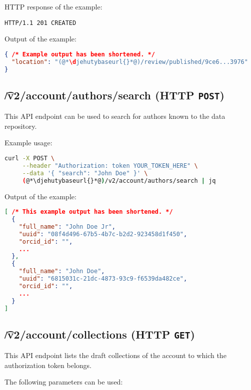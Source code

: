   HTTP response of the example:
\begin{lstlisting}
HTTP/1.1 201 CREATED
\end{lstlisting}

  Output of the example:
\begin{lstlisting}[language=JSON]
{ /* Example output has been shortened. */
  "location": "(@*\djehutybaseurl{}*@)/review/published/9ce6...3976"
}
\end{lstlisting}

\subsection{\t{/v2/account/authors/search} (HTTP \texttt{POST})}

  This API endpoint can be used to search for authors known to the data
  repository.

  Example usage:
\begin{lstlisting}[language=bash]
curl -X POST \
     --header "Authorization: token YOUR_TOKEN_HERE" \
     --data '{ "search": "John Doe" }' \
     (@*\djehutybaseurl{}*@)/v2/account/authors/search | jq
\end{lstlisting}

  Output of the example:
\begin{lstlisting}[language=JSON]
[ /* This example output has been shortened. */
  {
    "full_name": "John Doe Jr",
    "uuid": "08f4d496-67b5-4b7c-b2d2-923458d1f450",
    "orcid_id": "",
    ...
  },
  {
    "full_name": "John Doe",
    "uuid": "6815031c-21dc-4873-93c9-f6539da482ce",
    "orcid_id": "",
    ...
  }
]
\end{lstlisting}

\subsection{\t{/v2/account/collections} (HTTP \texttt{GET})}

  This API endpoint lists the draft collections of the account to which the
  authorization token belongs.

  The following parameters can be used:

